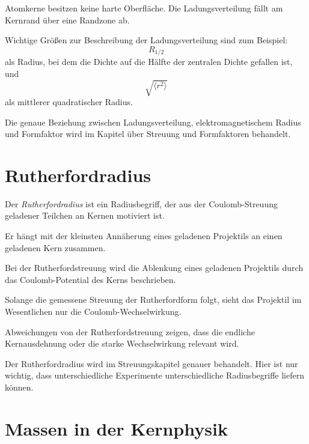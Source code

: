 \begin{conceptbox}
Atomkerne besitzen keine harte Oberfläche.
Die Ladungsverteilung fällt am Kernrand über eine Randzone ab.

Wichtige Größen zur Beschreibung der Ladungsverteilung sind zum Beispiel:
\[
    R_{1/2}
\]
als Radius, bei dem die Dichte auf die Hälfte der zentralen Dichte gefallen ist,
und
\[
    \sqrt{\langle r^2\rangle}
\]
als mittlerer quadratischer Radius.
\end{conceptbox}

\begin{notebox}
Die genaue Beziehung zwischen Ladungsverteilung, elektromagnetischem Radius und
Formfaktor wird im Kapitel über Streuung und Formfaktoren behandelt.
\end{notebox}

\section{Rutherfordradius}

\begin{definitionbox}
Der \emph{Rutherfordradius} ist ein Radiusbegriff, der aus der Coulomb-Streuung
geladener Teilchen an Kernen motiviert ist.

Er hängt mit der kleinsten Annäherung eines geladenen Projektils an einen geladenen
Kern zusammen.
\end{definitionbox}

\begin{conceptbox}
Bei der Rutherfordstreuung wird die Ablenkung eines geladenen Projektils durch das
Coulomb-Potential des Kerns beschrieben.

Solange die gemessene Streuung der Rutherfordform folgt, sieht das Projektil im
Wesentlichen nur die Coulomb-Wechselwirkung.

Abweichungen von der Rutherfordstreuung zeigen, dass die endliche Kernausdehnung
oder die starke Wechselwirkung relevant wird.
\end{conceptbox}

\begin{notebox}
Der Rutherfordradius wird im Streuungskapitel genauer behandelt.
Hier ist nur wichtig, dass unterschiedliche Experimente unterschiedliche
Radiusbegriffe liefern können.
\end{notebox}

\section{Massen in der Kernphysik}

